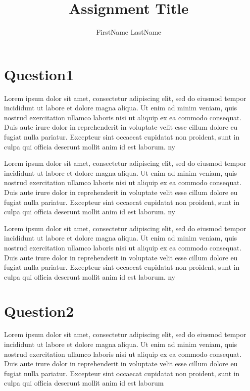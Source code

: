 \documentclass[
    12pt	%
    ]{article}
\title{Assignment Title}
\author{FirstName LastName}
\begin{document}
  

\maketitle

\settowidth{\parindent}{~~~~~}

\tableofcontents
\listoffigures
\listoftables

\section{Question1}
Lorem ipsum dolor sit amet, consectetur adipiscing elit, sed do eiusmod tempor incididunt ut labore et dolore magna aliqua. Ut enim ad minim veniam, quis nostrud exercitation ullamco laboris nisi ut aliquip ex ea commodo consequat. Duis aute irure dolor in reprehenderit in voluptate velit esse cillum dolore eu fugiat nulla pariatur. Excepteur sint occaecat cupidatat non proident, sunt in culpa qui officia deserunt mollit anim id est laborum. \ac{ny}

Lorem ipsum dolor sit amet, consectetur adipiscing elit, sed do eiusmod tempor incididunt ut labore et dolore magna aliqua. Ut enim ad minim veniam, quis nostrud exercitation ullamco laboris nisi ut aliquip ex ea commodo consequat. Duis aute irure dolor in reprehenderit in voluptate velit esse cillum dolore eu fugiat nulla pariatur. Excepteur sint occaecat cupidatat non proident, sunt in culpa qui officia deserunt mollit anim id est laborum. \ac{ny}

Lorem ipsum dolor sit amet, consectetur adipiscing elit, sed do eiusmod tempor incididunt ut labore et dolore magna aliqua. Ut enim ad minim veniam, quis nostrud exercitation ullamco laboris nisi ut aliquip ex ea commodo consequat. Duis aute irure dolor in reprehenderit in voluptate velit esse cillum dolore eu fugiat nulla pariatur. Excepteur sint occaecat cupidatat non proident, sunt in culpa qui officia deserunt mollit anim id est laborum. \ac{ny}

\section{Question2}
Lorem ipsum dolor sit amet, consectetur adipiscing elit, sed do eiusmod tempor incididunt ut labore et dolore magna aliqua. Ut enim ad minim veniam, quis nostrud exercitation ullamco laboris nisi ut aliquip ex ea commodo consequat. Duis aute irure dolor in reprehenderit in voluptate velit esse cillum dolore eu fugiat nulla pariatur. Excepteur sint occaecat cupidatat non proident, sunt in culpa qui officia deserunt mollit anim id est laborum \cite{zorlu2005effect}
\end{document}
